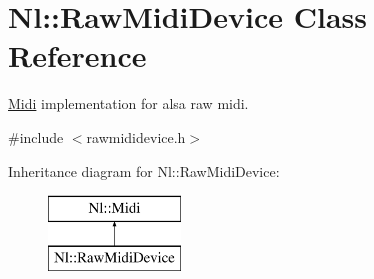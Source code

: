 \hypertarget{classNl_1_1RawMidiDevice}{}\section{Nl\+:\+:Raw\+Midi\+Device Class Reference}
\label{classNl_1_1RawMidiDevice}


\hyperlink{classNl_1_1Midi}{Midi} implementation for alsa raw midi.  




{\ttfamily \#include $<$rawmididevice.\+h$>$}

Inheritance diagram for Nl\+:\+:Raw\+Midi\+Device\+:\begin{figure}[H]
\begin{center}
\leavevmode
\includegraphics[height=2.000000cm]{classNl_1_1RawMidiDevice}
\end{center}
\end{figure}
